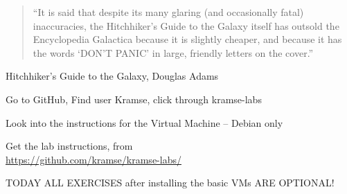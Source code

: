 \documentclass[Screen16to9,17pt]{foils}
\begin{document}
\begin{quote}
“It is said that despite its many glaring (and occasionally fatal) inaccuracies, the Hitchhiker’s Guide to the Galaxy itself has outsold the Encyclopedia Galactica because it is slightly cheaper, and because it has the words ‘DON’T PANIC’ in large, friendly letters on the cover.”
\end{quote}
Hitchhiker’s Guide to the Galaxy, Douglas Adams


\begin{list2}
\item Go to GitHub, Find user Kramse, click through kramse-labs
\item Look into the instructions for the Virtual Machine -- Debian only

\item Get the lab instructions, from\\ {\footnotesize\url{https://github.com/kramse/kramse-labs/}}
\end{list2}

\centerline{\Large TODAY ALL EXERCISES after installing the basic VMs ARE OPTIONAL!}





\end{document}
